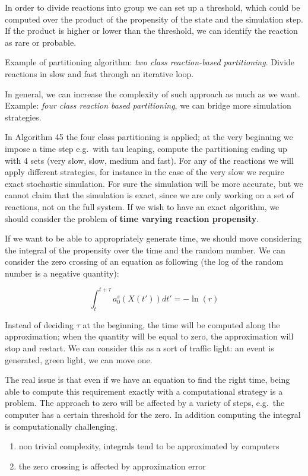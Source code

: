 In order to divide reactions into group we can set up a threshold, which
could be computed over the product of the propensity of the state and
the simulation step. If the product is higher or lower than the
threshold, we can identify the reaction as rare or probable.

Example of partitioning algorithm: \emph{two class reaction-based
partitioning}. Divide reactions in slow and fast through an iterative
loop.

In general, we can increase the complexity of such approach as much as
we want. Example: \emph{four class reaction based partitioning}, we can
bridge more simulation strategies.

In Algorithm 45 the four class partitioning is applied; at the very
beginning we impose a time step e.g.~with tau leaping, compute the
partitioning ending up with 4 sets (very slow, slow, medium and fast).
For any of the reactions we will apply different strategies, for
instance in the case of the very slow we require exact stochastic
simulation. For sure the simulation will be more accurate, but we cannot
claim that the simulation is exact, since we are only working on a set
of reactions, not on the full system. If we wish to have an exact
algorithm, we should consider the problem of \textbf{time varying
reaction propensity}.

If we want to be able to appropriately generate time, we should move
considering the integral of the propensity over the time and the random
number. We can consider the zero crossing of an equation as following
(the log of the random number is a negative quantity):

$$
\int_t^{t+\tau} a_0^s (X(t')) dt' = - \ln(r)
$$

Instead of deciding $\tau$ at the beginning, the time will be computed
along the approximation; when the quantity will be equal to zero, the
approximation will stop and restart. We can consider this as a sort of
traffic light: an event is generated, green light, we can move one.

The real issue is that even if we have an equation to find the right
time, being able to compute this requirement exactly with a
computational strategy is a problem. The approach to zero will be
affected by a variety of steps, e.g.~the computer has a certain
threshold for the zero. In addition computing the integral is
computationally challenging.

\begin{enumerate}
\def\labelenumi{\arabic{enumi}.}
\tightlist
\item
  non trivial complexity, integrals tend to be approximated by computers
\item
  the zero crossing is affected by approximation error
\end{enumerate}

